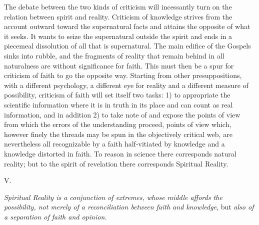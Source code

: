 \documentclass[12pt,a4paper,openany]{book}
\newcommand{\opage}[1]{\marginnote{\footnotesize\textit{[#1]}}}
\begin{document}
The debate between the two kinds of criticism will incessantly
turn on the relation between spirit and reality.
Criticism of knowledge strives from the account outward toward
the supernatural facts and attains the opposite of
what it seeks. It wants to seize the supernatural outside
the spirit and ends in a piecemeal dissolution of all
that is supernatural. The main edifice of the Gospels sinks into
rubble, and the fragments of reality that remain behind in all
naturalness are without significance for faith. This
must then be a spur for criticism of faith to go the
opposite way. Starting from other presuppositions, with a
different psychology, a different eye for reality and a different
measure of possibility, criticism of faith will set itself two
tasks: 1) to appropriate the scientific information
where it is in truth in its place and can count
as real information, and in addition 2) to take note
of and expose the points of view from which the errors of the understanding
proceed, points of view which, however finely the threads
may be spun in the objectively critical web, are nevertheless all
\setcounter{footnote}{0}%
\opage{28}recognizable by a faith half-vitiated by knowledge and a knowledge
distorted in faith. To reason in science there corresponds
natural reality; but to the spirit of revelation there corresponds
Spiritual Reality.

\begin{center}V.\end{center}

\emph{Spiritual Reality is a conjunction of
extremes, whose middle affords the possibility, not
merely of a reconciliation between faith and knowledge}, but
\emph{also of a separation of faith and opinion.}
\end{document}
